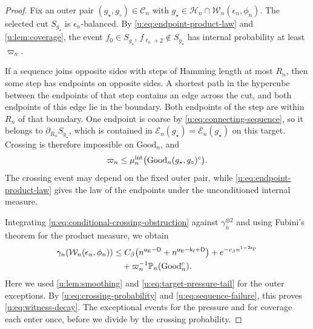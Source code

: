 \begin{proof}
Fix an outer pair $(g_\star,g_\circ)\in\mathcal C_n$ with
$g_\star\in\mathcal H_n\cap\mathcal W_n(\epsilon_n,\phi_n)$.
The selected cut $S_{g_\star}$ is $\epsilon_n$-balanced. By
\eqref{u:eq:endpoint-product-law} and \cref{u:lem:coverage}, the event
$f_0\in S_{g_\star}$, $f_{\ell_n+2}\notin S_{g_\star}$ has internal
probability at least $\varpi_n$.

If a sequence joins opposite sides with steps of Hamming length at most
$R_n$, then some step has endpoints on opposite sides.
A shortest path in the hypercube between the endpoints of that step
contains an edge across the cut, and both endpoints of this edge lie in the
boundary.
Both endpoints of the step are within $R_n$ of that boundary. One endpoint
is coarse by \eqref{u:eq:connecting-sequence}, so it belongs to
$\partial_{R_n}S_{g_\star}$, which is contained in
$\mathcal E_n(g_\star)=\overline{\mathcal E}_n(g_\star)$ on this target.
Crossing is therefore impossible on $\mathrm{Good}_n$, and
\begin{equation}\label{u:eq:conditional-crossing-obstruction}
 \varpi_n\le
 \mu^{\rm int}_n\bigl(\mathrm{Good}_n(g_\star,g_\circ)^c\bigr).
\end{equation}
The crossing event may depend on the fixed outer pair, while \eqref{u:eq:endpoint-product-law} gives the law of the endpoints
under the unconditioned internal measure.

Integrating \eqref{u:eq:conditional-crossing-obstruction} against
$\gamma_n^{\otimes2}$ and using Fubini's theorem for the product measure, we obtain
\[
 \begin{split}
 \gamma_n(\mathcal W_n(\epsilon_n,\phi_n))
 &\le C_\beta\bigl(n^{\mathsf{u}_{\rm E}-\mathsf{D}}
                +n^{\mathsf{u}_{\rm E}-\mathsf{k}_{\rm f}+\mathsf{D}}\bigr)
        +e^{-c_\beta n^{1-2\mathsf{z}_{\rm P}}}\\
 &\quad+\varpi_n^{-1}\mathbb P_n(\mathrm{Good}_n^c).
 \end{split}
\]
Here we used \cref{u:lem:smoothing} and
\eqref{u:eq:target-pressure-tail} for the outer exceptions. By
\eqref{u:eq:crossing-probability} and \eqref{u:eq:sequence-failure}, this
proves \eqref{u:eq:witness-decay}. The exceptional events for the pressure and for coverage each enter
once, before we divide by the crossing probability.
\end{proof}
